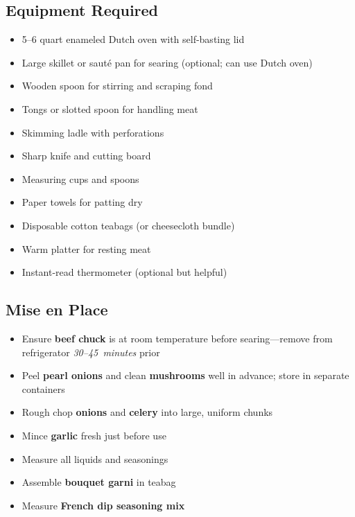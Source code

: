 \documentclass[11pt,letterpaper]{article}
\begin{document}
\newpage

{\small
\setlength{\columnsep}{20pt}
\setlength{\multicolsep}{6pt}
\begin{multicols}{2}
\setlength{\parindent}{0pt}
\setlength{\parskip}{4pt}

\subsection*{Equipment Required}
\begin{itemize}
    \item 5--6 quart enameled Dutch oven with self-basting lid
    \item Large skillet or sauté pan for searing (optional; can use Dutch oven)
    \item Wooden spoon for stirring and scraping fond
    \item Tongs or slotted spoon for handling meat
    \item Skimming ladle with perforations
    \item Sharp knife and cutting board
    \item Measuring cups and spoons
    \item Paper towels for patting dry
    \item Disposable cotton teabags (or cheesecloth bundle)
    \item Warm platter for resting meat
    \item Instant-read thermometer (optional but helpful)
\end{itemize}

\subsection*{Mise en Place}
\begin{itemize}
    \item Ensure \textbf{beef chuck} is at room temperature before searing---remove from refrigerator \textit{30--45~minutes} prior
    \item Peel \textbf{pearl onions} and clean \textbf{mushrooms} well in advance; store in separate containers
    \item Rough chop \textbf{onions} and \textbf{celery} into large, uniform chunks
    \item Mince \textbf{garlic} fresh just before use
    \item Measure all liquids and seasonings
    \item Assemble \textbf{bouquet garni} in teabag
    \item Measure \textbf{French dip seasoning mix}
\end{itemize}


\end{multicols}}
\end{document}
